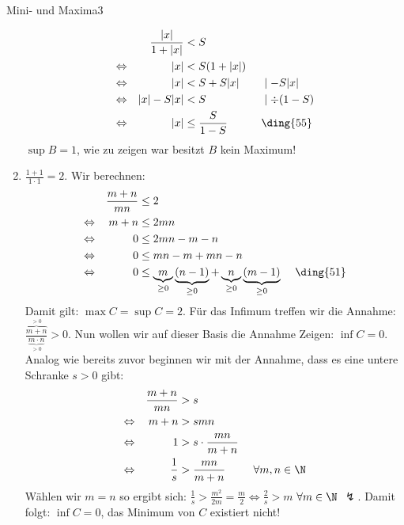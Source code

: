 \begin{aufgabe}{Mini- und Maxima}{3}
\begin{enumerate}[label=\textbf{\Alph*:} ]
\begin{alignat*}{3}
        && \frac{|x|}{1 + |x|} & < S  \qquad\qquad &&\\
        \Leftrightarrow && |x| &< S (1 + |x|) \\
        \Leftrightarrow && |x| &< S + S|x| && \mid -S|x| \\
        \Leftrightarrow && |x| - S|x| & < S &&\mid \div(1 - S)\\
        \Leftrightarrow && |x| &\leq \frac{S}{1 - S} && \text{\ding{55}}
    \end{alignat*}
    $\sup B = 1$, wie zu zeigen war besitzt $B$ kein Maximum!
    \item $\frac{1+1}{1\cdot 1} = 2$. Wir berechnen:
     \begin{alignat*}{3}
        && \frac{m+n}{mn} & \leq 2  \qquad\qquad &&\\
        \Leftrightarrow && m+n &\leq 2mn\\
        \Leftrightarrow && 0 &\leq 2mn - m - n\\
        \Leftrightarrow && 0 &\leq mn -m + mn -n\\
        \Leftrightarrow && 0 &\leq  \underbrace{m}_{\geq 0} \underbrace{(n-1)}_{\geq 0} + \underbrace{n}_{\geq 0} \underbrace{(m - 1)}_{\geq 0} && \text{ \ding{51}}\\
    \end{alignat*}
    Damit gilt: $\max C = \sup C = 2$. Für das Infimum treffen wir die Annahme: $\frac{\overbrace{m+n}^{> 0}}{\underbrace{m\cdot n}_{> 0}} > 0$. Nun wollen wir auf dieser Basis die Annahme Zeigen: $\inf C = 0$. \\
    Analog wie bereits zuvor beginnen wir mit der Annahme, dass es eine untere Schranke $s > 0$ gibt: \begin{alignat*}{3}
        && \frac{m+n}{mn} & > s  \qquad\qquad &&\\
        \Leftrightarrow && m+n &> smn \\
        \Leftrightarrow && 1 & > s \cdot \frac{mn}{m+n}\\
        \Leftrightarrow && \frac{1}{s} & > \frac{mn}{m+n} && \forall m,n \in \N\\
    \end{alignat*}
    Wählen wir $m = n$ so ergibt sich: $\frac{1}{s} > \frac{m^2}{2m} = \frac{m}{2} \Leftrightarrow \frac{2}{s} > m$ $\forall m \in \N$ $\lightning$. \newline
    Damit folgt: $\inf C = 0$, das Minimum von $C$ existiert nicht!
\end{enumerate}
\end{aufgabe}
